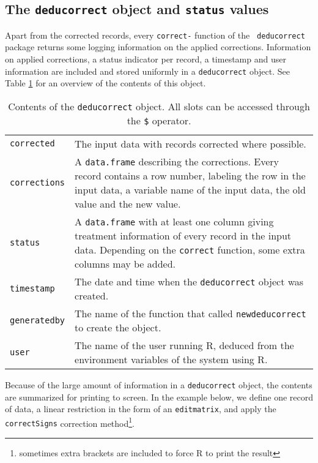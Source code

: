 \documentclass[11pt, fleqn, a4paper]{article}
\begin{document}
\subsection{The {\tt deducorrect} object and {\tt status} values}
\label{deducorrectObjectSection}
Apart from the corrected records, every {\tt correct-} function of the {\tt
deducorrect} package returns some logging information on the applied
corrections. Information on applied corrections, a status indicator per record,
a timestamp and user information are included and stored uniformly in a
{\tt deducorrect} object. See Table \ref{deducorrectObject} for an
overview of the contents of this object.
%
\begin{table}
\begin{threeparttable}
\caption{Contents of the {\tt deducorrect} object. All slots can be accessed through the {\tt \$} operator.}
\label{deducorrectObject}
\begin{tabular}{lp{}}
\hline
{\tt corrected}   & The input data with records corrected where possible.\\
{\tt corrections} & A {\tt data.frame} describing the corrections. Every record contains a row number, labeling the
row in the input data, a variable name of the input data, the old value and the new value.\\
{\tt status} & A {\tt data.frame} with at least one column giving treatment information of every record in the input data.
    Depending on the {\tt correct} function, some extra columns may be added. \\
{\tt timestamp}   & The date and time when the {\tt deducorrect} object was created.\\
{\tt generatedby} & The name of the function that called {\tt newdeducorrect} to create the object.\\
{\tt user}        & The name of the user running R, deduced from the environment variables of the system using R.\\
\hline
\end{tabular}
\end{threeparttable}
\end{table}
%
Because of the large amount of information in a {\tt deducorrect} object, the
contents are summarized for printing to screen. In the example below, we define one
record of data, a linear restriction in the form of an {\tt editmatrix}, and
apply the {\tt correctSigns} correction method\footnote{sometimes extra
brackets are included to force R to print the result}.
\end{document}
